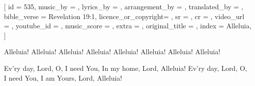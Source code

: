 [
    id                  = {535},
    music_by            = {}, %
    lyrics_by           = {}, %
    arrangement_by      = {}, %
    translated_by       = {}, %
    bible_verse         = {Revelation 19:1},
    licence_or_copyright= {},
    sr                  = {},
    cr                  = {},
    video_url           = {}, %
    youtube_id          = {}, %
    music_score         = {}, %
    extra               = {},
    original_title      = {}, %
    index               = {Alleluia},
]

\beginverse
Alleluia! Alleluia! Alleluia! Alleluia! 
Alleluia! Alleluia! Alleluia! Alleluia!
\endverse

\beginverse
Ev'ry day, Lord, O, I need You, In my home, Lord, Alleluia! 
Ev'ry day, Lord, O, I need You, I am Yours, Lord, Alleluia!
\endverse

\endsong
